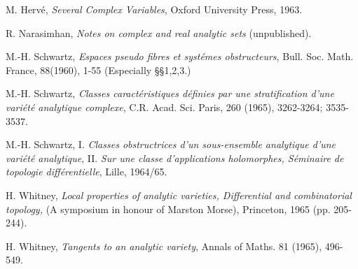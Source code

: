 \begin{thebibliography}{99}
 M. Herv\'e, \textit{Several Complex
  Variables}, Oxford University Press, 1963.  


 R. Narasimhan, \textit{Notes on complex and real
  analytic sets} (unpublished). 

 M.-H. Schwartz, \textit{Espaces pseudo fibres et
  syst\'emes obstructeurs}, Bull. Soc. Math. France,
  88(1960), 1-55 (Especially \S\S 1,2,3.) 

 M.-H. Schwartz, \textit{Classes
  caract\'eristiques d\'efinies par une stratification d'une
  vari\'et\'e analytique complexe}, C.R. Acad. Sci. Paris, 260 (1965),
  3262-3264; 3535-3537. 

 M.-H. Schwartz, I. \textit{Classes obstructrices d'un
  sous-ensemble analytique d'une
  vari\'et\'e analytique}, II. \textit{Sur une classe d'applications
  holomorphes, S\'eminaire de topologie
  diff\'erentielle}, Lille, 1964/65. 

 H. Whitney, \textit{Local properties of analytic
  varieties, Differential and combinatorial topology,} (A symposium in
  honour of Marston Morse), Princeton, 1965 (pp. 205-244). 

 H. Whitney, \textit{Tangents to an analytic
  variety}, Annals of Maths. 81 (1965), 496-549. 
\end{thebibliography}

